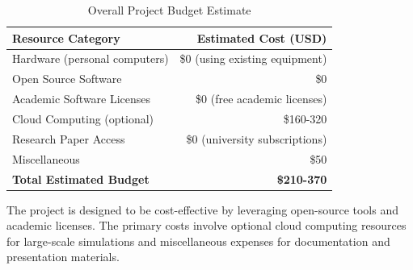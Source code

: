 \begin{table}[htbp]
\centering
\begin{tabular}{|l|r|}
\hline
\textbf{Resource Category} & \textbf{Estimated Cost (USD)} \\
\hline
Hardware (personal computers) & \$0 (using existing equipment) \\
\hline
Open Source Software & \$0 \\
\hline
Academic Software Licenses & \$0 (free academic licenses) \\
\hline
Cloud Computing (optional) & \$160-320 \\
\hline
Research Paper Access & \$0 (university subscriptions) \\
\hline
Miscellaneous & \$50 \\
\hline
\textbf{Total Estimated Budget} & \textbf{\$210-370} \\
\hline
\end{tabular}
\caption{Overall Project Budget Estimate}
\label{tab:budget}
\end{table}

The project is designed to be cost-effective by leveraging open-source tools and academic licenses. The primary costs involve optional cloud computing resources for large-scale simulations and miscellaneous expenses for documentation and presentation materials.